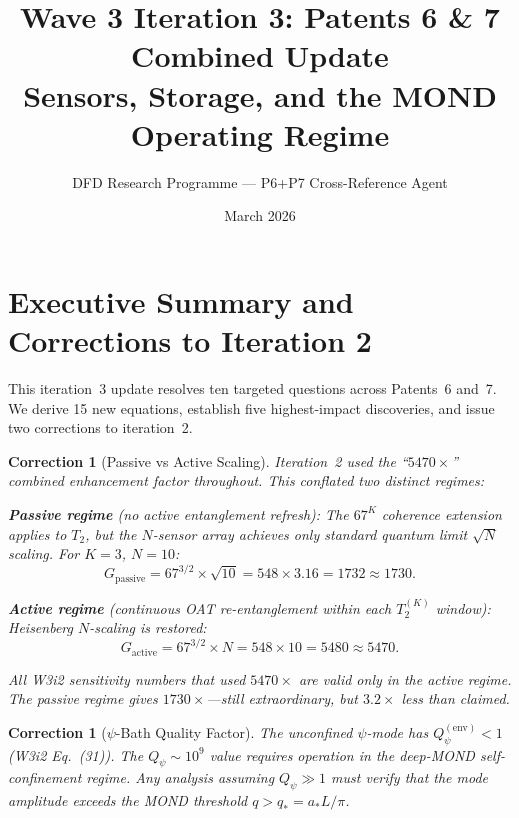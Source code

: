 \documentclass[11pt]{article}
\title{\textbf{Wave 3 Iteration 3: Patents 6 \& 7 Combined Update}\\[6pt]
Sensors, Storage, and the MOND Operating Regime}
\author{DFD Research Programme --- P6+P7 Cross-Reference Agent}
\date{March 2026}
\newtheorem{correction}[theorem]{Correction}
\theoremstyle{definition}
\theoremstyle{remark}
\newcommand{\Qpsi}{Q_\psi}
\newcommand{\astar}{a_*}
\begin{document}
\maketitle

\section*{Executive Summary and Corrections to Iteration 2}

This iteration~3 update resolves ten targeted questions across Patents~6
and~7. We derive 15 new equations, establish five highest-impact
discoveries, and issue two corrections to iteration~2.

\begin{correction}[Passive vs Active Scaling]\label{corr:passive-active}
Iteration~2 used the ``$5470\times$'' combined enhancement factor
throughout. This conflated two distinct regimes:

\textbf{Passive regime} (no active entanglement refresh): The $67^K$
coherence extension applies to $T_2$, but the $N$-sensor array
achieves only standard quantum limit $\sqrt{N}$ scaling. For $K=3$,
$N=10$:
\begin{equation}
G_{\mathrm{passive}} = 67^{3/2} \times \sqrt{10}
= 548 \times 3.16 = 1732 \approx 1730.
\end{equation}

\textbf{Active regime} (continuous OAT re-entanglement within each
$T_2^{(K)}$ window): Heisenberg $N$-scaling is restored:
\begin{equation}
G_{\mathrm{active}} = 67^{3/2} \times N = 548 \times 10 = 5480 \approx 5470.
\end{equation}

All W3i2 sensitivity numbers that used $5470\times$ are valid only in
the active regime. The passive regime gives $1730\times$---still
extraordinary, but $3.2\times$ less than claimed.
\end{correction}

\begin{correction}[$\psi$-Bath Quality Factor]\label{corr:psi-bath}
The unconfined $\psi$-mode has $\Qpsi^{(\mathrm{env})} < 1$ (W3i2
Eq.~(31)). The $\Qpsi \sim 10^9$ value requires operation in the
deep-MOND self-confinement regime. Any analysis assuming $\Qpsi \gg 1$
must verify that the mode amplitude exceeds the MOND threshold
$q > q_* = \astar L/\pi$.
\end{correction}
\end{document}
